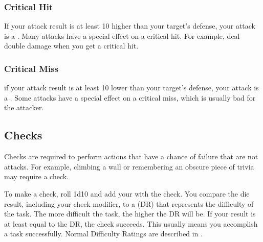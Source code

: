         \subsubsection{Critical Hit}\label{Critical Hit}
            If your attack result is at least 10 higher than your target's defense, your attack is a .
            Many attacks have a special effect on a critical hit.
            For example,  deal double damage when you get a critical hit.

        \subsubsection{Critical Miss}\label{Critical Miss}
            if your attack result is at least 10 lower than your target's defense, your attack is a .
            Some attacks have a special effect on a critical miss, which is usually bad for the attacker.

    \subsection{Checks}\label{Checks}
        Checks are required to perform actions that have a chance of failure that are not attacks.
        For example, climbing a wall or remembering an obscure piece of trivia may require a check.

        To make a check, roll 1d10 and add your  with the check.
        You compare the die result, including your check modifier, to a  (DR) that represents the difficulty of the task.
        The more difficult the task, the higher the DR will be.
        If your result is at least equal to the DR, the check succeeds.
        This usually means you accomplish a task successfully.
        Normal Difficulty Ratings are described in .

